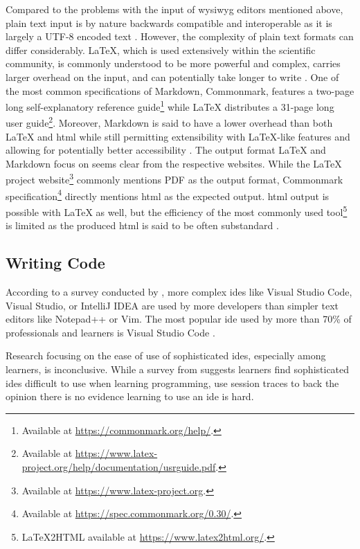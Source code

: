 Compared to the problems with the input of \gls{wysiwyg} editors mentioned above, plain text input is by nature backwards compatible and interoperable as it is largely a UTF-8 encoded text \parencite{shieber_why_2014}.
However, the complexity of plain text formats can differ considerably.
LaTeX, which is used extensively within the scientific community, is commonly understood to be more powerful and complex, carries larger overhead on the input, and can potentially take longer to write \parencites{baramidze_latex_2013}{knauff_efficiency_2014}{shieber_why_2014}.
One of the most common specifications of Markdown, Commonmark, features a two-page long self-explanatory reference guide\footnote{Available at \url{https://commonmark.org/help/}.} while LaTeX distributes a 31-page long user guide\footnote{Available at \url{https://www.latex-project.org/help/documentation/usrguide.pdf}.}.
Moreover, Markdown is said to have a lower overhead than both LaTeX and \gls{html} \parencite{shieber_why_2014} while still permitting extensibility with LaTeX-like features \parencite{shieber_why_2014} and allowing for potentially better accessibility \parencite{voegler_markdown_2014}.
The output format LaTeX and Markdown focus on seems clear from the respective websites.
While the LaTeX project website\footnote{Available at \url{https://www.latex-project.org}.} commonly mentions PDF as the output format, Commonmark specification\footnote{Available at \url{https://spec.commonmark.org/0.30/}.} directly mentions \gls{html} as the expected output.
\gls{html} output is possible with LaTeX as well, but the efficiency of the most commonly used tool\footnote{LaTeX2HTML available at \url{https://www.latex2html.org/}.} is limited as the produced \gls{html} is said to be often substandard \parencite{voegler_markdown_2014}.

\subsection{Writing Code}
\label{sec:writing-code}

According to a survey conducted by \textcite{StackOverflow_2023}, more complex \glspl{ide} like Visual Studio Code, Visual Studio, or IntelliJ IDEA are used by more developers than simpler text editors like Notepad++ or Vim.
The most popular \gls{ide} used by more than 70\% of professionals and learners is Visual Studio Code \parencite{StackOverflow_2023}.

Research focusing on the ease of use of sophisticated \glspl{ide}, especially among learners, is inconclusive.
While a survey from \textcite{owoseni_2016} suggests learners find sophisticated \glspl{ide} difficult to use when learning programming, \textcite{vihavainen_how_2014} use session traces to back the opinion there is no evidence learning to use an \gls{ide} is hard.

